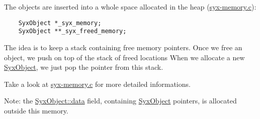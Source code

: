 The objects are inserted into a whole space allocated in the heap (\hyperlink{syx-memory_8c}{syx-memory.c}):



\begin{Code}\begin{verbatim}    SyxObject *_syx_memory;
    SyxObject **_syx_freed_memory;
\end{verbatim}
\end{Code}



The idea is to keep a stack containing free memory pointers. Once we free an object, we push on top of the stack of freed locations When we allocate a new \hyperlink{struct_syx_object}{SyxObject}, we just pop the pointer from this stack.

Take a look at \hyperlink{syx-memory_8c}{syx-memory.c} for more detailed informations. \begin{Desc}
\item[Note:]the \hyperlink{struct_syx_object_1613092e651dd77e4a0c1d0a1ec413cb}{SyxObject::data} field, containing \hyperlink{struct_syx_object}{SyxObject} pointers, is allocated outside this memory. \end{Desc}
